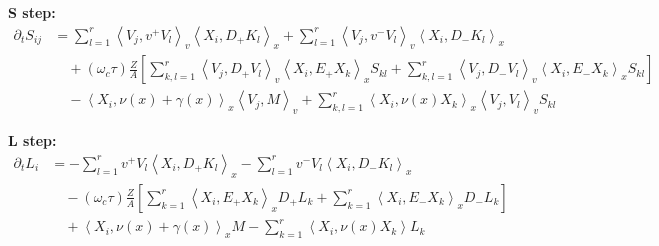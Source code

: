 \documentclass{article}
\begin{document}
\textbf{S step:}
\begin{align*}
    \partial_t S_{ij} &= \sum_{l=1}^r \left\langle V_j, v^+ V_l \right\rangle_v \left\langle X_i, D_+ K_l \right\rangle_x + \sum_{l=1}^r \left\langle V_j, v^- V_l \right\rangle_v \left\langle X_i, D_- K_l \right\rangle_x \\
                      &\quad + (\omega_c \tau) \frac{Z}{A} \left[ \sum_{k,l=1}^r \left\langle V_j, D_+ V_l \right\rangle_v \left\langle X_i, E_+ X_k \right\rangle_x S_{kl} + \sum_{k,l=1}^r \left\langle V_j, D_- V_l \right\rangle_v \left\langle X_i, E_- X_k \right\rangle_x S_{kl} \right] \\
                      &\quad - \left\langle X_i, \nu(x) +\gamma(x) \right\rangle_x \left\langle V_j, M \right\rangle_v + \sum_{k,l=1}^r \left\langle X_i, \nu(x) X_k \right\rangle_x \left\langle V_j, V_l \right\rangle_v  S_{kl}
\end{align*}

\textbf{L step:}
\begin{align*}
    \partial_t L_i &= -\sum_{l=1}^r v^+ V_l \left\langle X_i, D_+ K_l \right\rangle_x - \sum_{l=1}^r v^- V_l \left\langle X_i, D_- K_l \right\rangle_x \\
                   &\quad - (\omega_c \tau) \frac{Z}{A} \left[ \sum_{k=1}^r \left\langle X_i, E_+ X_k \right\rangle_x D_+ L_k + \sum_{k=1}^r \left\langle X_i, E_- X_k \right\rangle_x D_- L_k  \right] \\
                   &\quad + \left\langle X_i, \nu(x) + \gamma(x) \right\rangle_x M - \sum_{k=1}^r \left\langle X_i, \nu(x) X_k \right\rangle L_k
\end{align*}
\end{document}
